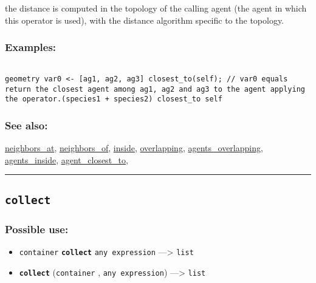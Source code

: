 \documentclass[]{book}
\providecommand{\tightlist}{%
  \setlength{\itemsep}{0pt}\setlength{\parskip}{0pt}}
\theoremstyle{definition}
\theoremstyle{definition}
\theoremstyle{definition}
\theoremstyle{remark}
\begin{document}
the distance is computed in the topology of the calling agent (the agent
in which this operator is used), with the distance algorithm specific to
the topology.

\subsubsection{Examples:}\label{examples-68}

\begin{verbatim}
 
geometry var0 <- [ag1, ag2, ag3] closest_to(self); // var0 equals return the closest agent among ag1, ag2 and ag3 to the agent applying the operator.(species1 + species2) closest_to self 
\end{verbatim}

\subsubsection{See also:}\label{see-also-54}

\href{OperatorsNR\#neighbors_at}{neighbors\_at},
\href{OperatorsNR\#neighbors_of}{neighbors\_of},
\href{OperatorsIM\#inside}{inside},
\href{OperatorsNR\#overlapping}{overlapping},
\href{OperatorsAA\#agents_overlapping}{agents\_overlapping},
\href{OperatorsAA\#agents_inside}{agents\_inside},
\href{OperatorsAA\#agent_closest_to}{agent\_closest\_to},

\begin{center}\rule{0.5\linewidth}{\linethickness}\end{center}

\subsection{\texorpdfstring{\texttt{collect}}{collect}}\label{collect}

\subsubsection{Possible use:}\label{possible-use-90}

\begin{itemize}
\tightlist
\item
  \texttt{container} \textbf{\texttt{collect}} \texttt{any\ expression}
  ---\textgreater{} \texttt{list}
\item
  \textbf{\texttt{collect}} (\texttt{container} ,
  \texttt{any\ expression}) ---\textgreater{} \texttt{list}
\end{itemize}
\end{document}
